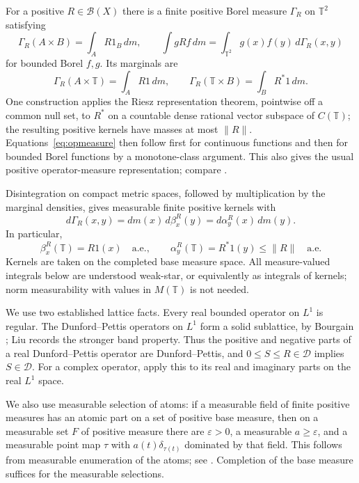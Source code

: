 \documentclass[11pt,reqno]{amsart}
\theoremstyle{definition}
\theoremstyle{remark}
\newcommand{\T}{\mathbb T}
\newcommand{\B}{\mathcal B}
\newcommand{\D}{\mathcal D}
\begin{document}
For a positive $R\in\B(X)$ there is a finite positive Borel measure $\Gamma_R$ on $\T^2$ satisfying
\begin{equation}\label{eq:opmeasure}
 \Gamma_R(A\times B)=\int_A R1_B\,dm,
 \qquad
 \int gRf\,dm=\int_{\T^2}g(x)f(y)\,d\Gamma_R(x,y)
\end{equation}
for bounded Borel $f,g$. Its marginals are
\begin{equation}\label{eq:marginals}
 \Gamma_R(A\times\T)=\int_A R1\,dm,\qquad
 \Gamma_R(\T\times B)=\int_B R^*1\,dm.
\end{equation}
One construction applies the Riesz representation theorem, pointwise off a common null set, to $R^*$ on a countable dense rational vector subspace of $C(\T)$; the resulting positive kernels have masses at most $\|R\|$. Equations~\eqref{eq:opmeasure} then follow first for continuous functions and then for bounded Borel functions by a monotone-class argument. This also gives the usual positive operator-measure representation; compare \cite[Section~1]{Liu}.

Disintegration on compact metric spaces, followed by multiplication by the marginal densities, gives measurable finite positive kernels with
\begin{equation}\label{eq:disint}
 d\Gamma_R(x,y)=dm(x)\,d\beta_x^R(y)
                 =d\alpha_y^R(x)\,dm(y).
\end{equation}
In particular,
\[
 \beta_x^R(\T)=R1(x)\quad\text{a.e.},\qquad
 \alpha_y^R(\T)=R^*1(y)\leq\|R\|\quad\text{a.e.}
\]
Kernels are taken on the completed base measure space. All measure-valued integrals below are understood weak-star, or equivalently as integrals of kernels; norm measurability with values in $M(\T)$ is not needed.

We use two established lattice facts. Every real bounded operator on $L^1$ is regular. The Dunford--Pettis operators on $L^1$ form a solid sublattice, by Bourgain \cite{Bourgain}; Liu \cite[Lemma~2.17]{Liu} records the stronger band property. Thus the positive and negative parts of a real Dunford--Pettis operator are Dunford--Pettis, and $0\leq S\leq R\in\D$ implies $S\in\D$. For a complex operator, apply this to its real and imaginary parts on the real $L^1$ space.

We also use measurable selection of atoms: if a measurable field of finite positive measures has an atomic part on a set of positive base measure, then on a measurable set $F$ of positive measure there are $\varepsilon>0$, a measurable $a\geq\varepsilon$, and a measurable point map $\tau$ with $a(t)\delta_{\tau(t)}$ dominated by that field. This follows from measurable enumeration of the atoms; see \cite[Theorems~1.3--1.4]{Liu}. Completion of the base measure suffices for the measurable selections.
\end{document}

